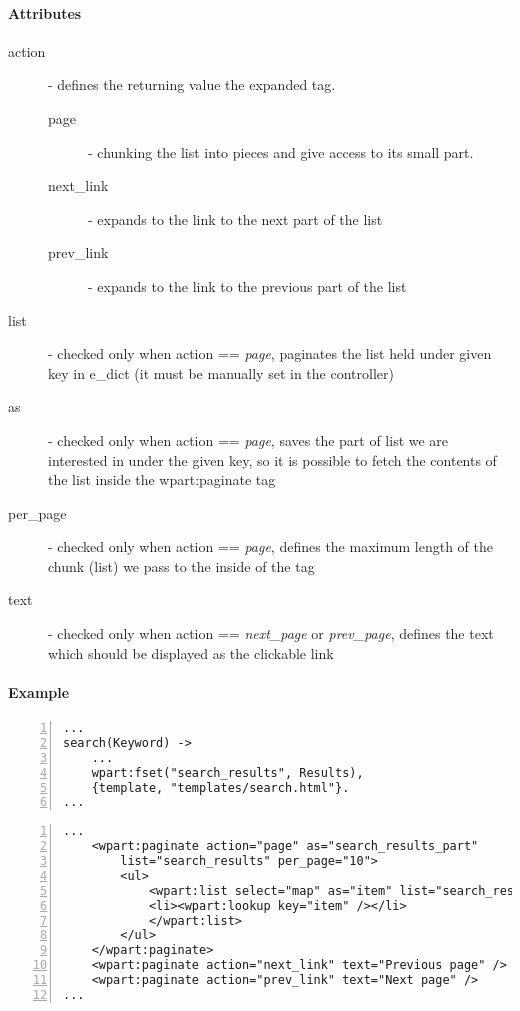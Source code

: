 \paragraph{Attributes}
\begin{description}
\item[action]- defines the returning value the expanded tag. 
\begin{description}
\item[page]- chunking the list into pieces and give access to its small part.
\item[next\_link]- expands to the link to the next part of the list
\item[prev\_link]- expands to the link to the previous part of the list
\end{description}
\item[list]- checked only when action == {\it page}, paginates the list held under given key in e\_dict (it must be manually set in the controller)
\item[as]- checked only when action == {\it page}, saves the part of list we are interested in under the given key, so it is possible to fetch the contents of the list inside the wpart:paginate tag
\item[per\_page]- checked only when action == {\it page}, defines the maximum length of the chunk (list) we pass to the inside of the tag
\item[text]- checked only when action == {\it next\_page} or  {\it prev\_page}, defines the text which should be displayed as the clickable link
\end{description}

\paragraph{Example}
\begin{Verbatim}[numbers=left, frame=single, label=controller.erl]
...
search(Keyword) ->
    ...
    wpart:fset("search_results", Results),
    {template, "templates/search.html"}.
...
\end{Verbatim}
\begin{Verbatim}[numbers=left, frame=single, label=search.html]
...
    <wpart:paginate action="page" as="search_results_part" 
        list="search_results" per_page="10">
        <ul>
            <wpart:list select="map" as="item" list="search_results_part">
            <li><wpart:lookup key="item" /></li>
            </wpart:list>
        </ul>
    </wpart:paginate>
    <wpart:paginate action="next_link" text="Previous page" /> || 
    <wpart:paginate action="prev_link" text="Next page" />
...
\end{Verbatim}
